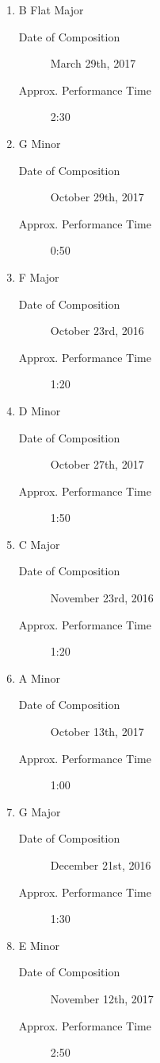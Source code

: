 \documentclass{jarticle}
\begin{document}
\begin{enumerate}
\item B Flat Major
	\begin{description}
	\item[Date of Composition] March 29th, 2017
	\item[Approx. Performance Time] 2:30
	\end{description}
\item G Minor
	\begin{description}
	\item[Date of Composition] October 29th, 2017
	\item[Approx. Performance Time] 0:50
	\end{description}

\item F Major
	\begin{description}
	\item[Date of Composition] October 23rd, 2016
	\item[Approx. Performance Time] 1:20
	\end{description}
\item D Minor
	\begin{description}
	\item[Date of Composition] October 27th, 2017
	\item[Approx. Performance Time] 1:50
	\end{description}

\item C Major
	\begin{description}
	\item[Date of Composition] November 23rd, 2016
	\item[Approx. Performance Time] 1:20
	\end{description}
\item A Minor
	\begin{description}
	\item[Date of Composition] October 13th, 2017
	\item[Approx. Performance Time] 1:00
	\end{description}

\item G Major
	\begin{description}
	\item[Date of Composition] December 21st, 2016
	\item[Approx. Performance Time] 1:30
	\end{description}
\item E Minor
	\begin{description}
	\item[Date of Composition] November 12th, 2017
	\item[Approx. Performance Time] 2:50
	\end{description}


\end{enumerate}
\end{document}
